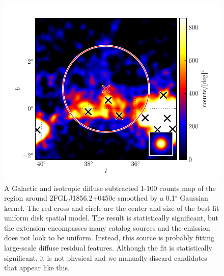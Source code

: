 \documentclass[12pt,preprint]{aastex}
\newcommand{\gev}{\text{GeV}\xspace}
\renewcommand{\deg}{\ensuremath{^\circ}\xspace}
\begin{document}
\clearpage
\begin{figure}
  \begin{center}
    \includegraphics{source_plots/example_bad_fit.pdf}
    \caption{
    A Galactic and isotropic diffuse subtracted 1-100 \gev counts map of
    the region around 2FGL\,J1856.2+0450c smoothed by a 0.1\deg Gaussian
    kernel. The red cross and circle are the center and size of the
    best fit uniform disk spatial model. The result is statistically
    significant, but the extension encompasses many catalog sources and
    the emission does not look to be uniform. Instead, this source is
    probably fitting large-scale diffuse residual features. Although the
    fit is statistically significant, it is not physical and we manually
    discard candidates that appear like this.
    }
    \label{example_bad_fit}
  \end{center}
\end{figure}
\end{document}
